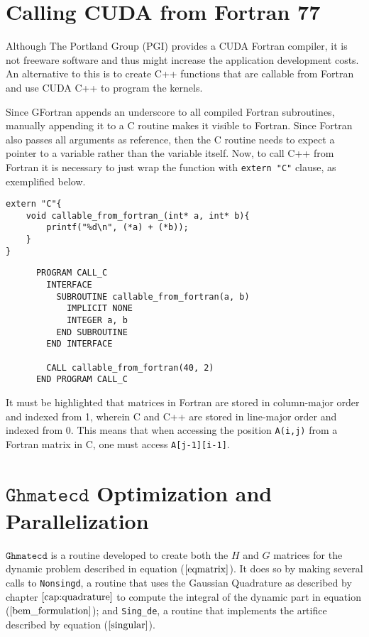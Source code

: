 \section{Calling CUDA from Fortran 77}

Although The Portland Group (PGI) provides a CUDA Fortran compiler, it is not freeware software 
and thus might increase the application development costs. An alternative to this is to 
create C++ functions that are callable from Fortran and use CUDA C++ to program the kernels.

Since GFortran appends an underscore to all compiled Fortran subroutines, manually appending it 
 to a C routine makes it visible to Fortran. Since Fortran also passes all arguments 
as reference, then the C routine needs to expect a pointer to a variable rather than the variable 
itself. Now, to call C++ from Fortran it is necessary to just wrap the function with \texttt{extern "C"}
clause, as exemplified below.
\\
\begin{minipage}{\textwidth}
\lstset{language=C}
\begin{lstlisting}
extern "C"{
	void callable_from_fortran_(int* a, int* b){
		printf("%d\n", (*a) + (*b));
	}
}
\end{lstlisting}
\lstset{language=Fortran}
\begin{lstlisting}
      PROGRAM CALL_C
        INTERFACE
          SUBROUTINE callable_from_fortran(a, b)
            IMPLICIT NONE
            INTEGER a, b
          END SUBROUTINE
        END INTERFACE

        CALL callable_from_fortran(40, 2)
      END PROGRAM CALL_C
\end{lstlisting}
\end{minipage}
It must be highlighted that matrices in Fortran are stored in column-major order and indexed from 1, 
wherein C and C++ are stored in line-major order and indexed from 0. This means that when accessing 
the position \texttt{A(i,j)} from a Fortran matrix in C, one must access \texttt{A[j-1][i-1]}.

\section{$\texttt{Ghmatecd}$ Optimization and Parallelization}

$\texttt{Ghmatecd}$ is a routine developed to create both the $H$ and $G$ matrices for the dynamic problem 
described in equation ($\ref{eqmatrix}$). It does so by making several calls to \texttt{Nonsingd}, a routine
that uses the Gaussian Quadrature as described by chapter $\ref{cap:quadrature}$ to compute the integral of the 
dynamic part in equation ($\ref{bem_formulation}$); and \texttt{Sing\_de}, a routine 
that implements the artifice described by equation ($\ref{singular}$).

